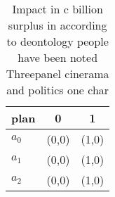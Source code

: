 \documentclass[a4paper]{article}
\begin{document}
\begin{table}
\begin{adjustbox}{width=0.7\columnwidth}
\begin{tabular}{|l|l|l|}
\hline
\textbf{plan} & \multicolumn{1}{c|}{\textbf{0}} & \multicolumn{1}{c|}{\textbf{1}} \\ \hline
\textbf{$a_0$}  & (0,0) & (1,0) \\ \hline
\textbf{$a_1$}  & (0,0) & (1,0) \\ \hline
\textbf{$a_2$}  & (0,0) & (1,0) \\ \hline
\end{tabular}
\end{adjustbox}
\caption{Impact in c billion surplus in according to deontology people have been noted Threepanel cinerama and politics one char
}
\end{table}
\end{document}

